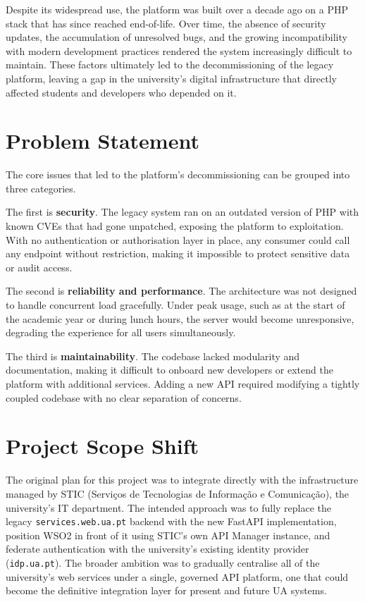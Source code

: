 \documentclass[12pt, a4paper]{report}
\begin{document}
Despite its widespread use, the platform was built over a decade ago on a PHP stack that has
since reached end-of-life. Over time, the absence of security updates, the accumulation
of unresolved bugs, and the growing incompatibility with modern development practices
rendered the system increasingly difficult to maintain. These factors ultimately led to
the decommissioning of the legacy platform, leaving a gap in the university's digital
infrastructure that directly affected students and developers who depended on it.

\section{Problem Statement}
The core issues that led to the platform's decommissioning can be grouped into three
categories.

The first is \textbf{security}. The legacy system ran on an outdated version of PHP
with known CVEs that had gone unpatched, exposing the platform to exploitation. With
no authentication or authorisation layer in place, any consumer could call any endpoint
without restriction, making it impossible to protect sensitive data or audit access.

The second is \textbf{reliability and performance}. The architecture was not designed
to handle concurrent load gracefully. Under peak usage, such as at the start of the
academic year or during lunch hours, the server would become unresponsive, degrading
the experience for all users simultaneously.

The third is \textbf{maintainability}. The codebase lacked modularity and documentation,
making it difficult to onboard new developers or extend the platform with additional
services. Adding a new API required modifying a tightly coupled codebase with no clear
separation of concerns.

\section{Project Scope Shift}\label{sec:scope_shift}
The original plan for this project was to integrate directly with the infrastructure
managed by STIC (Serviços de Tecnologias de Informação e Comunicação), the university's
IT department. The intended approach was to fully replace the legacy \texttt{services.web.ua.pt}
backend with the new FastAPI implementation, position WSO2 in front of it using STIC's
own API Manager instance, and federate authentication with the university's existing
identity provider (\texttt{idp.ua.pt}). The broader ambition was to gradually centralise
all of the university's web services under a single, governed API platform, one that
could become the definitive integration layer for present and future UA systems.
\end{document}
